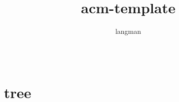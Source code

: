 \documentclass[a4paper,11pt]{article}
\author{langman}
\title{acm-template}
\begin{document}
\maketitle
\begin{CJK}{UTF8}{gbsn}
\inputminted{c++}{a.cpp}
\end{CJK}
\section{tree}
\end{document}
